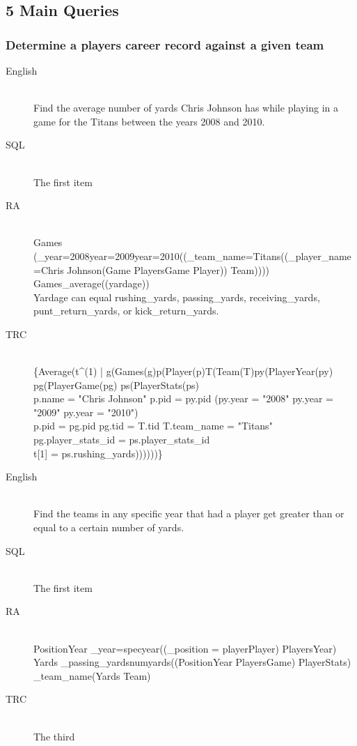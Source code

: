 \documentclass[12pt,letterpaper]{article}
\begin{document}
\subsection{5 Main Queries}

\subsubsection{Determine a players career record against a given team}
\begin{description}
  \item[English] \hfill \\
  Find the average number of yards Chris Johnson has while playing in a game for the Titans between the years 2008 and 2010.
  \item[SQL] \hfill \\
  The first item
  \item[RA] \hfill \\
  Games \leftarrow(\sigma_{year=2008\vee year=2009\vee year=2010}((\sigma_{team_name=Titans}((\sigma_{player_name=Chris Johnson}(Game \bowtie PlayersGame \bowtie Player)) \bowtie Team))))\\
  Games_{average(\sigma(yardage))}\\
  Yardage can equal rushing\_yards, passing\_yards, receiving\_yards, punt\_return\_yards, or kick\_return\_yards.
  \item[TRC] \hfill \\
  \{Average(t^{(1)} | \exists g(Games(g)\wedge \exists p(Player(p)\wedge \exists T(Team(T)\wedge \exists py(PlayerYear(py) \wedge \exists pg(PlayerGame(pg) \wedge \exists ps(PlayerStats(ps) \wedge\\
p.name = "Chris Johnson" \wedge p.pid = py.pid \wedge (py.year = "2008" \vee py.year = "2009" \vee py.year = "2010")\wedge\\
p.pid = pg.pid \wedge pg.tid = T.tid \wedge T.team\_name = "Titans" \wedge pg.player\_stats\_id = ps.player\_stats\_id \wedge\\
t[1] = ps.rushing\_yards))))))\}
\end{description}
\begin{description}
  \item[English] \hfill \\
  Find the teams in any specific year that had a player get greater than or equal to a certain number of yards.
  \item[SQL] \hfill \\
  The first item
  \item[RA] \hfill \\
  PositionYear \leftarrow \sigma_{year=specyear}((\sigma_{position = player}Player) \bowtie PlayersYear)\\
  Yards \leftarrow \sigma_{passing\_yards\geq numyards}((PositionYear \bowtie PlayersGame) \bowtie PlayerStats)\\
  \Pi_{team\_name}(Yards \bowtie Team)
  \item[TRC] \hfill \\
  The third
\end{description}
\end{document}
